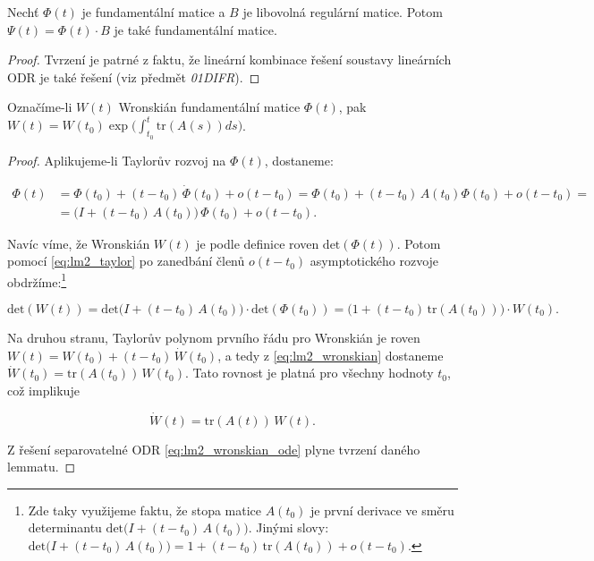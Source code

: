 \medskip

\begin{lemma}\label{lm:1}
	Nechť $\Phi(t)$ je fundamentální matice a $B$ je libovolná regulární matice. Potom $\Psi(t) = \Phi(t) \cdot B$ je také fundamentální matice.
	
	\begin{proof}
		Tvrzení je patrné z faktu, že lineární kombinace řešení soustavy lineárních ODR je také řešení (viz předmět \textit{01DIFR}).
	\end{proof}
\end{lemma}

\begin{lemma}\label{lm:2}
	Označíme-li $W(t)$ Wronskián fundamentální matice $\Phi(t)$, pak $W(t) = W(t_{0}) \exp \big( {\int_{t_{0}}^{t}} \mathrm{tr}(A(s)) ds \big)$.
	
	\begin{proof}
		Aplikujeme-li Taylorův rozvoj na $\Phi(t)$, dostaneme: 
		
		\begin{equation}\label{eq:lm2_taylor}
			\begin{split}
				\Phi(t) &= \Phi(t_{0}) + (t - t_{0}) \, \dot{\Phi}(t_{0}) + o(t-t_{0}) 
				= 
				\Phi(t_{0}) + (t - t_{0}) \, A(t_{0}) \Phi(t_{0}) + o(t-t_{0}) = \\
				&= \Big( I + (t - t_{0}) \, A(t_{0}) \Big) \, \Phi(t_{0}) + o(t-t_{0}). 
			\end{split}
		\end{equation}
		
		Navíc víme, že Wronskián $W(t)$ je podle definice roven $\mathrm{det}(\Phi(t))$. Potom pomocí \eqref{eq:lm2_taylor} po zanedbání členů $o(t-t_{0})$ asymptotického rozvoje obdržíme:\footnote{Zde taky využijeme faktu, že stopa matice $A(t_{0})$ je první derivace ve směru determinantu $\mathrm{det} \Big( I + (t - t_{0}) \, A(t_{0}) \Big)$. Jinými slovy: $\mathrm{det} \Big( I + (t - t_{0}) \, A(t_{0}) \Big) = 1 + (t - t_{0}) \, \mathrm{tr} (A(t_{0})) + o(t-t_{0})$.}
		
		\begin{equation}\label{eq:lm2_wronskian}
			\mathrm{det}(W(t))	= \mathrm{det} \Big( I + (t - t_{0}) \, A(t_{0}) \Big) \cdot \mathrm{det}(\Phi(t_{0})) 
			=
			\Big( 1 + (t - t_{0}) \, \mathrm{tr} (A(t_{0})) \Big) \cdot W(t_{0}) .
		\end{equation}
		
		Na druhou stranu, Taylorův polynom prvního řádu pro Wronskián je roven $W(t) = W(t_{0}) + (t-t_{0}) \, \dot{W}(t_{0})$, a tedy z \eqref{eq:lm2_wronskian} dostaneme $\dot{W}(t_{0} ) =  \mathrm{tr} (A(t_{0})) \, W(t_{0})$. Tato rovnost je platná pro všechny hodnoty $t_{0}$, což implikuje
		
		\begin{equation}\label{eq:lm2_wronskian_ode}
			\dot{W}(t) = \mathrm{tr} (A(t)) \, W(t).
		\end{equation}
		
		Z řešení separovatelné ODR \eqref{eq:lm2_wronskian_ode} plyne tvrzení daného lemmatu.
	\end{proof}
\end{lemma}